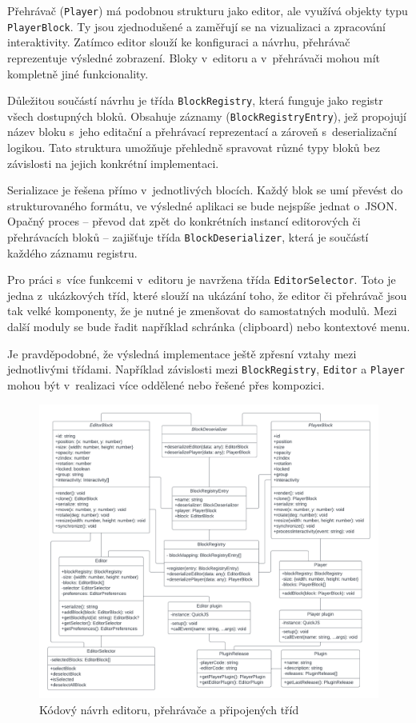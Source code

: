 Přehrávač (\texttt{Player}) má podobnou strukturu jako editor, ale využívá objekty typu \texttt{PlayerBlock}. 
Ty jsou zjednodušené a zaměřují se na vizualizaci a zpracování interaktivity. 
Zatímco editor slouží ke konfiguraci a návrhu, přehrávač reprezentuje výsledné zobrazení.
Bloky v~editoru a v~přehrávači mohou mít kompletně jiné funkcionality.

Důležitou součástí návrhu je třída \texttt{BlockRegistry}, která funguje jako registr všech dostupných bloků. 
Obsahuje záznamy (\texttt{BlockRegistryEntry}), jež propojují název bloku s~jeho editační a přehrávací reprezentací a zároveň s~deserializační logikou. 
Tato struktura umožňuje přehledně spravovat různé typy bloků bez závislosti na jejich konkrétní implementaci.

Serializace je řešena přímo v~jednotlivých blocích.
Každý blok se umí převést do strukturovaného formátu, ve výsledné aplikaci se bude nejspíše jednat o~JSON.
Opačný proces -- převod dat zpět do konkrétních instancí editorových či přehrávacích bloků -- zajišťuje třída \texttt{BlockDeserializer}, která je součástí každého záznamu registru.

Pro práci s~více funkcemi v~editoru je navržena třída \texttt{EditorSelector}. 
Toto je jedna z~ukázkových tříd, které slouží na ukázání toho, že editor či přehrávač jsou tak velké komponenty, že je nutné je zmenšovat do samostatných modulů.
Mezi další moduly se bude řadit například schránka (clipboard) nebo kontextové menu. 

Je pravděpodobné, že výsledná implementace ještě zpřesní vztahy mezi jednotlivými třídami.
Například závislosti mezi \texttt{BlockRegistry}, \texttt{Editor} a \texttt{Player} mohou být v~realizaci více oddělené nebo řešené přes kompozici.

\begin{figure}[ht!]
    \centering
    \includegraphics[width=1\textwidth]{media/04_navrh/kodovyNavrh.pdf}
    \caption{Kódový návrh editoru, přehrávače a připojených tříd}
    \label{fig:kodovyNavrhEditoruAPrehravace}
\end{figure}

